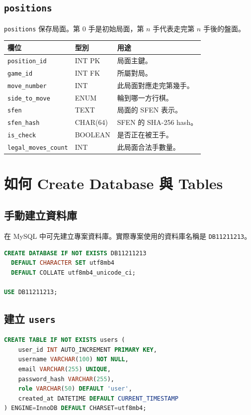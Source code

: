\documentclass[12pt,a4paper,fontset=none]{ctexart}
\begin{document}
\subsection{\texttt{positions}}

\texttt{positions} 保存局面。第 0 手是初始局面，第 $n$ 手代表走完第 $n$ 手後的盤面。

\begin{longtable}{p{}p{}p{}}
\toprule
\textbf{欄位} & \textbf{型別} & \textbf{用途}\\
\midrule
\endhead
\texttt{position\_id} & INT PK & 局面主鍵。\\
\texttt{game\_id} & INT FK & 所屬對局。\\
\texttt{move\_number} & INT & 此局面對應走完第幾手。\\
\texttt{side\_to\_move} & ENUM & 輪到哪一方行棋。\\
\texttt{sfen} & TEXT & 局面的 SFEN 表示。\\
\texttt{sfen\_hash} & CHAR(64) & SFEN 的 SHA-256 hash。\\
\texttt{is\_check} & BOOLEAN & 是否正在被王手。\\
\texttt{legal\_moves\_count} & INT & 此局面合法手數量。\\
\bottomrule
\end{longtable}

\section{如何 Create Database 與 Tables}

\subsection{手動建立資料庫}

在 MySQL 中可先建立專案資料庫。實際專案使用的資料庫名稱是 \texttt{DB11211213}。

\begin{lstlisting}[style=sqlstyle,language=SQL]
CREATE DATABASE IF NOT EXISTS DB11211213
  DEFAULT CHARACTER SET utf8mb4
  DEFAULT COLLATE utf8mb4_unicode_ci;

USE DB11211213;
\end{lstlisting}

\subsection{建立 \texttt{users}}

\begin{lstlisting}[style=sqlstyle,language=SQL]
CREATE TABLE IF NOT EXISTS users (
    user_id INT AUTO_INCREMENT PRIMARY KEY,
    username VARCHAR(100) NOT NULL,
    email VARCHAR(255) UNIQUE,
    password_hash VARCHAR(255),
    role VARCHAR(50) DEFAULT 'user',
    created_at DATETIME DEFAULT CURRENT_TIMESTAMP
) ENGINE=InnoDB DEFAULT CHARSET=utf8mb4;
\end{lstlisting}
\end{document}
